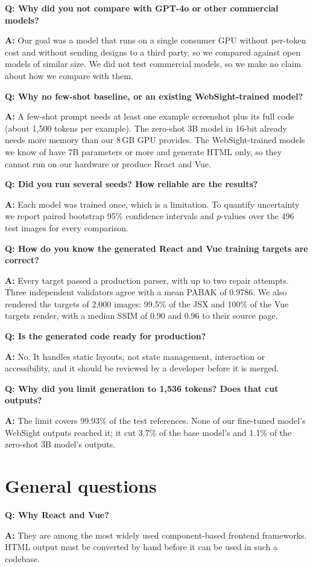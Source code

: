 \documentclass[11pt,a4paper]{article}
\newcommand{\q}[1]{\par\medskip\noindent\textbf{\color{navy}Q: #1}\par}
\newcommand{\ans}{\noindent\textbf{A:} }
\begin{document}
\q{Why did you not compare with GPT-4o or other commercial models?}
\ans Our goal was a model that runs on a single consumer GPU without per-token cost and without sending designs to a
third party, so we compared against open models of similar size. We did not test commercial models, so we make no claim
about how we compare with them.

\q{Why no few-shot baseline, or an existing WebSight-trained model?}
\ans A few-shot prompt needs at least one example screenshot plus its full code (about 1,500 tokens per example). The
zero-shot 3B model in 16-bit already needs more memory than our 8\,GB GPU provides. The WebSight-trained models we know
of have 7B parameters or more and generate HTML only, so they cannot run on our hardware or produce React and Vue.

\q{Did you run several seeds? How reliable are the results?}
\ans Each model was trained once, which is a limitation. To quantify uncertainty we report paired bootstrap 95\%
confidence intervals and $p$-values over the 496 test images for every comparison.

\q{How do you know the generated React and Vue training targets are correct?}
\ans Every target passed a production parser, with up to two repair attempts. Three independent validators agree with a
mean PABAK of 0.9786. We also rendered the targets of 2,000 images: 99.5\% of the JSX and 100\% of the Vue targets render,
with a median SSIM of 0.90 and 0.96 to their source page.

\q{Is the generated code ready for production?}
\ans No. It handles static layouts, not state management, interaction or accessibility, and it should be reviewed by a
developer before it is merged.

\q{Why did you limit generation to 1,536 tokens? Does that cut outputs?}
\ans The limit covers 99.93\% of the test references. None of our fine-tuned model's WebSight outputs reached it; it cut
3.7\% of the base model's and 1.1\% of the zero-shot 3B model's outputs.

\section{General questions}

\q{Why React and Vue?}
\ans They are among the most widely used component-based frontend frameworks. HTML output must be converted by hand
before it can be used in such a codebase.
\end{document}
